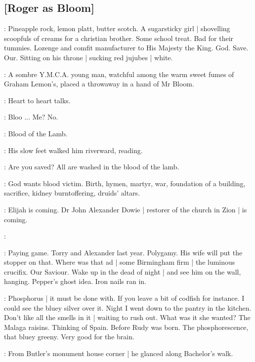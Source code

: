 \subsection{[Roger as Bloom]}

\BloomInt:
Pineapple rock, lemon platt, butter scotch.
A sugarsticky girl |
shovelling scoopfuls of creams for a christian brother.
Some school treat.
Bad for their tummies.
Lozenge and comfit manufacturer to His Majesty the King.
God.
Save.
Our.
Sitting on his throne |
sucking red jujubes |
white.

:
A sombre Y.M.C.A. young man,
watchful among the warm sweet fumes of Graham Lemon's,
placed a throwaway in a hand of Mr Bloom.

:
Heart to heart talks.

\BloomInt:
Bloo ...
Me?
No.

\BloomInt:
Blood of the Lamb.


:
His slow feet walked him riverward, reading.

:
Are you saved?
All are washed in the blood of the lamb.

\BloomInt:
God wants blood victim.
Birth, hymen, martyr, war,
foundation of a building,
sacrifice,
kidney burntoffering,
druids' altars.

:
Elijah is coming.
Dr John Alexander Dowie |
restorer of the church in Zion |
is coming.

:

\BloomInt:
Paying game.
Torry and Alexander last year.
Polygamy.
His wife will put the stopper on that.
Where was that ad |
some Birmingham firm |
the luminous crucifix.
Our Saviour.
Wake up in the dead of night |
and see him on the wall, hanging.
Pepper's ghost idea.
Iron nails ran in.

\BloomInt:
Phosphorus |
it must be done with.
If you leave a bit of codfish for instance.
I could see the bluey silver over it.
Night I went down to the pantry in the kitchen.
Don't like all the smells in it |
waiting to rush out.
What was it she wanted?
The Malaga raisins.
Thinking of Spain.
Before Rudy was born.
The phosphorescence, that bluey greeny.
Very good for the brain.

:
From Butler's monument house corner |
he glanced along Bachelor's walk.

